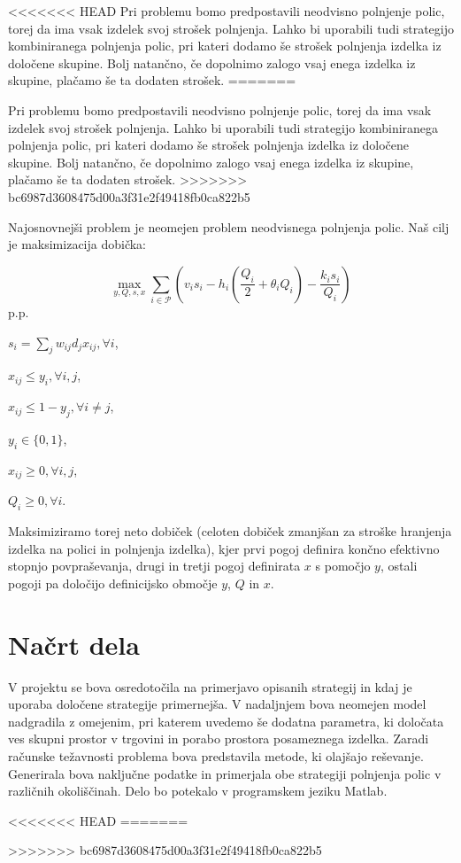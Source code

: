 \documentclass[a4paper]{article}
\begin{document}
<<<<<<< HEAD
 Pri problemu bomo predpostavili neodvisno polnjenje polic, torej da  ima vsak izdelek svoj strošek polnjenja. Lahko bi uporabili tudi strategijo kombiniranega polnjenja polic, pri kateri dodamo še strošek polnjenja izdelka iz določene skupine. Bolj natančno, če dopolnimo zalogo vsaj enega izdelka iz skupine, plačamo še ta dodaten strošek.
=======

Pri problemu bomo predpostavili neodvisno polnjenje polic, torej da  ima vsak izdelek svoj strošek polnjenja. Lahko bi uporabili tudi strategijo kombiniranega polnjenja polic, pri kateri dodamo še strošek polnjenja izdelka iz določene skupine. Bolj natančno, če dopolnimo zalogo vsaj enega izdelka iz skupine, plačamo še ta dodaten strošek.
>>>>>>> bc6987d3608475d00a3f31e2f49418fb0ca822b5


Najosnovnejši problem je neomejen problem neodvisnega polnjenja polic. Naš cilj je maksimizacija dobička:

$$  \max_{y, Q,  s, x}  \sum_{i \in \mathcal{P}} ( v_i s_ i - h_i (\frac{Q_i }{ 2} + \theta_i Q_i) - \frac{k_i s_i}{Q_i})   $$ 
p.p.

 $ s_i = \sum_j w_{ij} d_j x_{ij}, \forall i$,

$ x_{ij} \leq y_i, \forall i, j  $,

$ x_{ij} \leq 1 - y_j, \forall i \ne j$,

$ y_i \in \{0,1\}$,

$ x_{ij} \geq 0, \forall i,j$,

$Q_i \geq 0, \forall i$.

\vspace*{4 mm}
Maksimiziramo torej neto dobiček (celoten dobiček zmanjšan za stroške hranjenja izdelka na polici in polnjenja izdelka), kjer prvi pogoj definira končno efektivno stopnjo povpraševanja, drugi in tretji pogoj definirata $x$ s pomočjo $y$, ostali pogoji pa določijo definicijsko območje $y$, $Q$ in $x$.

 
\section{Načrt dela}

V projektu se bova osredotočila na primerjavo opisanih strategij in kdaj je uporaba določene strategije primernejša. V nadaljnjem bova neomejen model nadgradila z omejenim, pri katerem uvedemo še dodatna parametra, ki določata ves skupni prostor v trgovini in porabo prostora posameznega izdelka. Zaradi računske težavnosti problema bova predstavila metode, ki olajšajo reševanje. Generirala bova naključne podatke in primerjala obe strategiji polnjenja polic v različnih okoliščinah. Delo bo potekalo v programskem jeziku Matlab.


<<<<<<< HEAD
=======
	
>>>>>>> bc6987d3608475d00a3f31e2f49418fb0ca822b5
\end{document}
